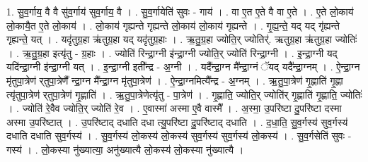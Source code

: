 \documentclass[17pt]{extarticle}
\begin{document}
1. सु॒व॒र्गाय॒ वै वै सु॑व॒र्गाय॑ सुव॒र्गाय॒ वै । . सु॒व॒र्गायेति॑ सुवः - गाय॑ । . वा ए॒त ए॒ते वै वा ए॒ते । . ए॒ते लो॒काय॑ लो॒कायै॒त ए॒ते लो॒काय॑ । . लो॒काय॑ गृह्यन्ते गृह्यन्ते लो॒काय॑ लो॒काय॑ गृह्यन्ते । . गृ॒ह्य॒न्ते॒ यद् यद् गृ॑ह्यन्ते गृह्यन्ते॒ यत् । . यदृ॑तुग्र॒हा ऋ॑तुग्र॒हा यद् यदृ॑तुग्र॒हाः । . ऋ॒तु॒ग्र॒हा ज्योति॒र् ज्योतिर्॑. ऋतुग्र॒हा ऋ॑तुग्र॒हा ज्योतिः॑ । . ऋ॒तु॒ग्र॒हा इत्यृ॑तु - ग्र॒हाः । . ज्योति॑ रिन्द्रा॒ग्नी इ॑न्द्रा॒ग्नी ज्योति॒र् ज्योति॑ रिन्द्रा॒ग्नी । . इ॒न्द्रा॒ग्नी यद् यदि॑न्द्रा॒ग्नी इ॑न्द्रा॒ग्नी यत् । . इ॒न्द्रा॒ग्नी इती᳚न्द्र - अ॒ग्नी । . यदै᳚न्द्रा॒ग्न मै᳚न्द्रा॒ग्नं ॅयद् यदै᳚न्द्रा॒ग्नम् । . ऐ॒न्द्रा॒ग्न मृ॑तुपा॒त्रेण॑ र्‌तुपा॒त्रेणै᳚ न्द्रा॒ग्न मै᳚न्द्रा॒ग्न मृ॑तुपा॒त्रेण॑ । . ऐ॒न्द्रा॒ग्नमित्यै᳚न्द्र - अ॒ग्नम् । . ऋ॒तु॒पा॒त्रेण॑ गृ॒ह्णाति॑ गृ॒ह्णा त्यृ॑तुपा॒त्रेण॑ र्‌तुपा॒त्रेण॑ गृ॒ह्णाति॑ । . ऋ॒तु॒पा॒त्रेणेत्यृ॑तु - पा॒त्रेण॑ । . गृ॒ह्णाति॒ ज्योति॒र् ज्योति॑र् गृ॒ह्णाति॑ गृ॒ह्णाति॒ ज्योतिः॑ । . ज्योति॑ रे॒वैव ज्योति॒र् ज्योति॑ रे॒व । . ए॒वास्मा॑ अस्मा ए॒वै वास्मै᳚ । . अ॒स्मा॒ उ॒परि॑ष्टा दु॒परि॑ष्टा दस्मा अस्मा उ॒परि॑ष्टात् । . उ॒परि॑ष्टाद् दधाति दधा त्यु॒परि॑ष्टा दु॒परि॑ष्टाद् दधाति । . द॒धा॒ति॒ सु॒व॒र्गस्य॑ सुव॒र्गस्य॑ दधाति दधाति सुव॒र्गस्य॑ । . सु॒व॒र्गस्य॑ लो॒कस्य॑ लो॒कस्य॑ सुव॒र्गस्य॑ सुव॒र्गस्य॑ लो॒कस्य॑ । . सु॒व॒र्गसेति॑ सुवः - गस्य॑ । . लो॒कस्या नु॑ख्यात्या॒ अनु॑ख्यात्यै लो॒कस्य॑ लो॒कस्या नु॑ख्यात्यै । \newline
\end{document}
